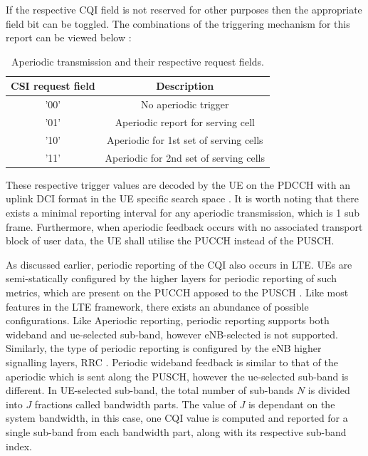 \documentclass{article}
\begin{document}
If the respective CQI field is not reserved for other purposes then the appropriate field bit can be toggled. The combinations of the triggering mechanism for this report can be viewed below \cite[Section 7.2.1]{ETSITS136213}: 

\begin{table}[H]
    \centering
     \begin{tabular}{||c c||} 
     \hline
      CSI request field & Description \\ [0.1ex] 
     \hline\hline
     '00' & No aperiodic trigger  \\ 
     \hline
     '01'  & Aperiodic report for serving cell\\
     \hline
     '10' & Aperiodic for 1st set of serving cells\\ 
     \hline
     '11'  & Aperiodic for 2nd set of serving cells\\
     \hline
    \end{tabular}
    \caption{Aperiodic transmission and their respective request fields.}
    \label{tab:cqi_aperiod}
\end{table}
These respective trigger values are decoded by the UE on the PDCCH with an uplink DCI format in the UE specific search space \cite[Section 7.2.1, Table 7.2]{ETSITS136213}.
It is worth noting that there exists a minimal reporting interval for any aperiodic transmission, which is 1 sub frame. Furthermore, when aperiodic feedback occurs with no associated transport block of user data, the UE shall utilise the PUCCH instead of the PUSCH.

As discussed earlier, periodic reporting of the CQI also occurs in LTE. UEs are semi-statically configured by the higher layers for periodic reporting of such metrics, which are present on the PUCCH apposed to the PUSCH \cite[Section 7.2.2]{ETSITS136213}. Like most features in the LTE framework, there exists an abundance of possible configurations. Like Aperiodic reporting, periodic reporting supports both wideband and ue-selected sub-band, however eNB-selected is not supported. Similarly, the type of periodic reporting is configured by the eNB higher signalling layers, RRC \cite[Section 10.2.1.2]{umts_sesia}. Periodic wideband feedback is similar to that of the aperiodic which is sent along the PUSCH, however the ue-selected sub-band is different. In UE-selected sub-band, the total number of sub-bands $N$ is divided into $J$ fractions called bandwidth parts. The value of $J$ is dependant on the system bandwidth, in this case, one CQI value is computed and reported for a single sub-band from each bandwidth part, along with its respective sub-band index.
\end{document}
